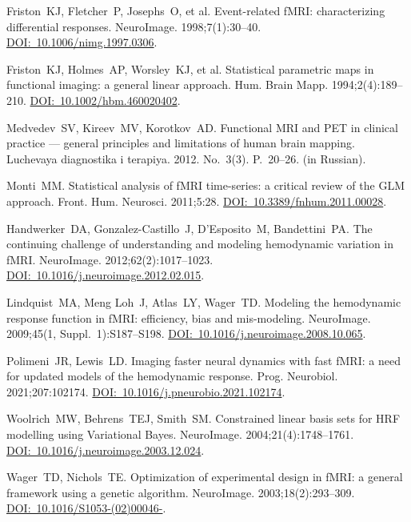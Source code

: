 \documentclass[11pt,twoside,a4paper]{article}
\begin{document}
{\begin{ltrtq}
	{Friston~KJ, Fletcher~P, Josephs~O, et al.} Event-related fMRI: characterizing differential responses. {NeuroImage}. 1998;7(1):30--40. \href{https://doi.org/10.1006/nimg.1997.0306}{DOI:~10.1006/\allowbreak nimg.1997.0306}.

	{Friston~KJ, Holmes~AP, Worsley~KJ, et al.} Statistical parametric maps in functional imaging: a general linear approach. {Hum. Brain Mapp}. 1994;2(4):189--210. \href{https://doi.org/10.1002/hbm.460020402}{DOI:~10.1002/\allowbreak hbm.460020402}.

	{Medvedev~SV, Kireev~MV, Korotkov~AD.} Functional MRI and PET in clinical practice --- general principles and limitations of human brain mapping. {Luchevaya diagnostika i terapiya}. 2012. No.~3(3). P.~20--26. (in Russian).

	{Monti~MM.} Statistical analysis of fMRI time-series: a critical review of the GLM approach. {Front. Hum. Neurosci}. 2011;5:28. \href{https://doi.org/10.3389/fnhum.2011.00028}{DOI:~10.3389/\allowbreak fnhum.2011.00028}.

	{Handwerker~DA, Gonzalez-Castillo~J, D'Esposito~M, Bandettini~PA.} The continuing challenge of understanding and modeling hemodynamic variation in fMRI. {NeuroImage}. 2012;62(2):1017--1023. \href{https://doi.org/10.1016/j.neuroimage.2012.02.015}{DOI:~10.1016/\allowbreak j.neuroimage.2012.02.015}.

	{Lindquist~MA, Meng Loh~J, Atlas~LY, Wager~TD.} Modeling the hemodynamic response function in fMRI: efficiency, bias and mis-modeling. {NeuroImage}. 2009;45(1, Suppl.~1):S187--S198. \href{https://doi.org/10.1016/j.neuroimage.2008.10.065}{DOI:~10.1016/\allowbreak j.neuroimage.2008.10.065}.

	{Polimeni~JR, Lewis~LD.} Imaging faster neural dynamics with fast fMRI: a need for updated models of the hemodynamic response. {Prog. Neurobiol}. 2021;207:102174. \href{https://doi.org/10.1016/j.pneurobio.2021.102174}{DOI:~10.1016/\allowbreak j.pneurobio.2021.102174}.

	{Woolrich~MW, Behrens~TEJ, Smith~SM.} Constrained linear basis sets for HRF modelling using Variational Bayes. {NeuroImage}. 2004;21(4):1748--1761. \href{https://doi.org/10.1016/j.neuroimage.2003.12.024}{DOI:~10.1016/\allowbreak j.neuroimage.2003.12.024}.

	{Wager~TD, Nichols~TE.} Optimization of experimental design in fMRI: a general framework using a genetic algorithm. {NeuroImage}. 2003;18(2):293--309. \href{https://doi.org/10.1016/S1053-8119(02)00046-0}{DOI:~10.1016/\allowbreak S1053-(02)00046-}.


\end{ltrtq}}
\end{document}
